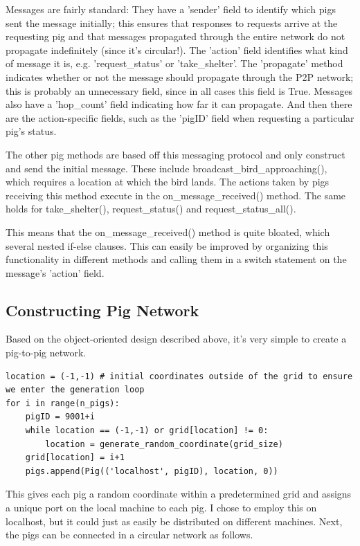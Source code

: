 \documentclass[]{article}
\begin{document}
Messages are fairly standard: They have a 'sender' field to identify which pigs sent the message initially; this ensures that responses to requests arrive at the requesting pig and that messages propagated through the entire network do not propagate indefinitely (since it's circular!). The 'action' field identifies what kind of message it is, e.g. 'request\_status' or 'take\_shelter'. The 'propagate' method indicates whether or not the message should propagate through the P2P network; this is probably an unnecessary field, since in all cases this field is True. Messages also have a 'hop\_count' field indicating how far it can propagate. And then there are the action-specific fields, such as the 'pigID' field when requesting a particular pig's status.

The other pig methods are based off this messaging protocol and only construct and send the initial message. These include broadcast\_bird\_approaching(), which requires a location at which the bird lands. The actions taken by pigs receiving this method execute in the on\_message\_received() method. The same holds for take\_shelter(), request\_status() and request\_status\_all().

This means that the on\_message\_received() method is quite bloated, which several nested if-else clauses. This can easily be improved by organizing this functionality in different methods and calling them in a switch statement on the message's 'action' field.

\subsection{Constructing Pig Network}

Based on the object-oriented design described above, it's very simple to create a pig-to-pig network.

\begin{lstlisting}
location = (-1,-1) # initial coordinates outside of the grid to ensure we enter the generation loop
for i in range(n_pigs):
    pigID = 9001+i
    while location == (-1,-1) or grid[location] != 0:
        location = generate_random_coordinate(grid_size)
    grid[location] = i+1
    pigs.append(Pig(('localhost', pigID), location, 0))
\end{lstlisting}

This gives each pig a random coordinate within a predetermined grid and assigns a unique port on the local machine to each pig. I chose to employ this on localhost, but it could just as easily be distributed on different machines. Next, the pigs can be connected in a circular network as follows.
\end{document}
